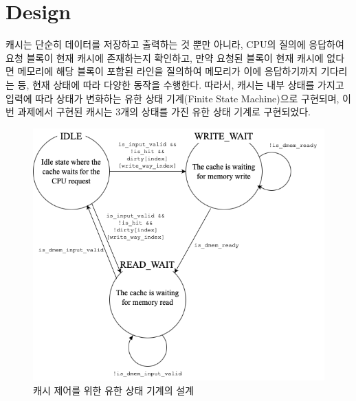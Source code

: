 \documentclass[openright, a4paper]{article}
\begin{document}

\section{Design}
캐시는 단순히 데이터를 저장하고 출력하는 것 뿐만 아니라, CPU의 질의에 응답하여
요청 블록이 현재 캐시에 존재하는지 확인하고, 만약 요청된 블록이 현재 캐시에 
없다면 메모리에 해당 블록이 포함된 라인을 질의하여 메모리가 이에 응답하기까지
기다리는 등, 현재 상태에 따라 다양한 동작을 수행한다. 따라서, 캐시는 내부 상태를
가지고 입력에 따라 상태가 변화하는 유한 상태 기계(Finite State Machine)으로 
구현되며, 이번 과제에서 구현된 캐시는 3개의 상태를 가진 유한 상태 기계로 
구현되었다.


\hfill

{
    \begin{figure}[!h]
        \centering
        \includegraphics[width=\textwidth]{img/diagram.png}
        \caption{캐시 제어를 위한 유한 상태 기계의 설계}
    \end{figure}
}

\hfill
\end{document}
